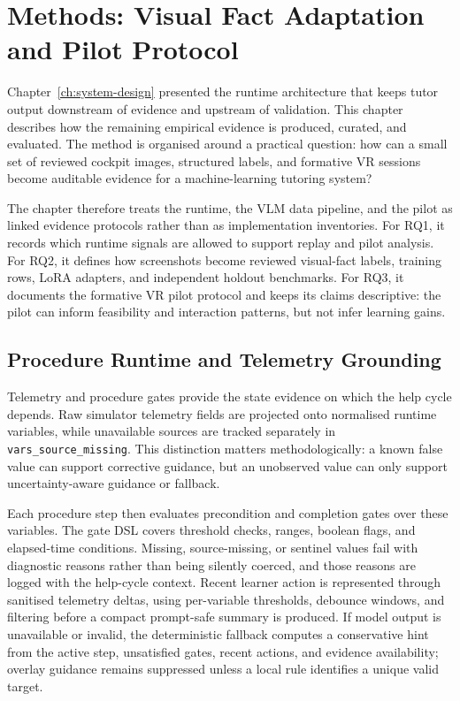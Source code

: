 %
\chapter{Methods: Visual Fact Adaptation and Pilot Protocol}\label{ch:methodology}

Chapter~\ref{ch:system-design} presented the runtime architecture that keeps
tutor output downstream of evidence and upstream of validation. This chapter
describes how the remaining empirical evidence is produced, curated, and
evaluated. The method is organised around a practical question: how can a small
set of reviewed cockpit images, structured labels, and formative VR sessions
become auditable evidence for a machine-learning tutoring system?

The chapter therefore treats the runtime, the VLM data pipeline, and the pilot
as linked evidence protocols rather than as implementation inventories. For
RQ1, it records which runtime signals are allowed to support replay and pilot
analysis. For RQ2, it defines how screenshots become reviewed visual-fact
labels, training rows, LoRA adapters, and independent holdout benchmarks. For
RQ3, it documents the formative VR pilot protocol and keeps its claims
descriptive: the pilot can inform feasibility and interaction patterns, but not
infer learning gains.

\section{Procedure Runtime and Telemetry Grounding}\label{sec:method-telemetry}

Telemetry and procedure gates provide the state evidence on which the help
cycle depends. Raw simulator telemetry fields are projected onto normalised runtime
variables, while unavailable sources are tracked separately in
\texttt{vars\_source\_missing}. This distinction matters methodologically: a
known false value can support corrective guidance, but an unobserved value can
only support uncertainty-aware guidance or fallback.

Each procedure step then evaluates precondition and completion gates over these
variables. The gate DSL covers threshold checks, ranges, boolean flags, and
elapsed-time conditions. Missing, source-missing, or sentinel values fail with
diagnostic reasons rather than being silently coerced, and those reasons are
logged with the help-cycle context. Recent learner action is represented through
sanitised telemetry deltas, using per-variable thresholds, debounce windows, and
filtering before a compact prompt-safe summary is produced. If model output is
unavailable or invalid, the deterministic fallback computes a conservative hint
from the active step, unsatisfied gates, recent actions, and evidence
availability; overlay guidance remains suppressed unless a local rule identifies
a unique valid target.

